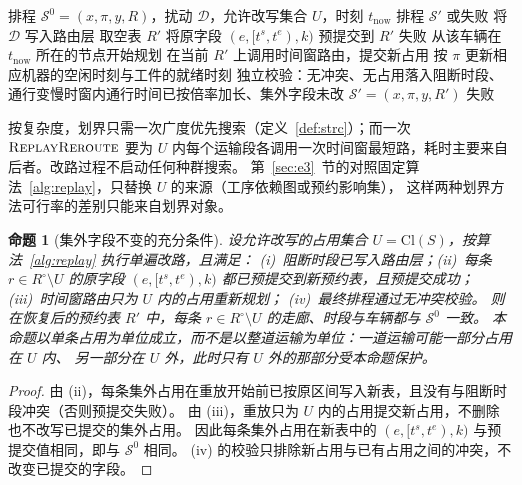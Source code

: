 \documentclass[manuscript,screen,review]{acmart}
\newtheorem{prop}{命题}
\begin{document}
\begin{algorithm}[t]
\caption{单遍改路 \(\textsc{ReplayReroute}\)}
\label{alg:replay}
\begin{algorithmic}[1]
\Require 排程 \(\mathcal{S}^0=(x,\pi,y,R)\)，扰动 \(\mathcal{D}\)，允许改写集合 \(U\)，时刻 \(t_{\mathrm{now}}\)
\Ensure 排程 \(\mathcal{S}'\) 或失败
\State 将 \(\mathcal{D}\) 写入路由层
\State 取空表 \(R'\)
  \State 将原字段 \((e,[t^s,t^e),k)\) 预提交到 \(R'\)
    \State \Return 失败
  \EndIf
\EndFor
{}
  \State 从该车辆在 \(t_{\mathrm{now}}\) 所在的节点开始规划 
  \State 在当前 \(R'\) 上调用时间窗路由，提交新占用
  \State 按 \(\pi\) 更新相应机器的空闲时刻与工件的就绪时刻
\EndFor
\State 独立校验：无冲突、无占用落入阻断时段、通行变慢时窗内通行时间已按倍率加长、集外字段未改
  \State \Return \(\mathcal{S}'=(x,\pi,y,R')\)
\Else
  \State \Return 失败
\EndIf
\end{algorithmic}
\end{algorithm}

按复杂度，划界只需一次广度优先搜索（定义~\ref{def:strc}）；而一次 \(\textsc{ReplayReroute}\)
要为 \(U\) 内每个运输段各调用一次时间窗最短路，耗时主要来自后者。改路过程不启动任何种群搜索。
第~\ref{sec:e3}~节的对照固定算法~\ref{alg:replay}，只替换 \(U\) 的来源（工序依赖图或预约影响集），
这样两种划界方法可行率的差别只能来自划界对象。

\begin{prop}[集外字段不变的充分条件]
\label{prop:outside}
设允许改写的占用集合 \(U=\mathrm{Cl}(S)\)，按算法~\ref{alg:replay} 执行单遍改路，且满足：
(i)~阻断时段已写入路由层；(ii)~每条 \(r\in R^{\circ}\setminus U\) 的原字段 \((e,[t^s,t^e),k)\)
都已预提交到新预约表，且预提交成功；(iii)~时间窗路由只为 \(U\) 内的占用重新规划；
(iv)~最终排程通过无冲突校验。
则在恢复后的预约表 \(R'\) 中，每条 \(r\in R^{\circ}\setminus U\) 的走廊、时段与车辆都与 \(\mathcal{S}^0\) 一致。
本命题以单条占用为单位成立，而不是以整道运输为单位：一道运输可能一部分占用在 \(U\) 内、
另一部分在 \(U\) 外，此时只有 \(U\) 外的那部分受本命题保护。
\end{prop}

\begin{proof}
由 (ii)，每条集外占用在重放开始前已按原区间写入新表，且没有与阻断时段冲突（否则预提交失败）。
由 (iii)，重放只为 \(U\) 内的占用提交新占用，不删除也不改写已提交的集外占用。
因此每条集外占用在新表中的 \((e,[t^s,t^e),k)\) 与预提交值相同，即与 \(\mathcal{S}^0\) 相同。
(iv) 的校验只排除新占用与已有占用之间的冲突，不改变已提交的字段。
\end{proof}
\end{document}
